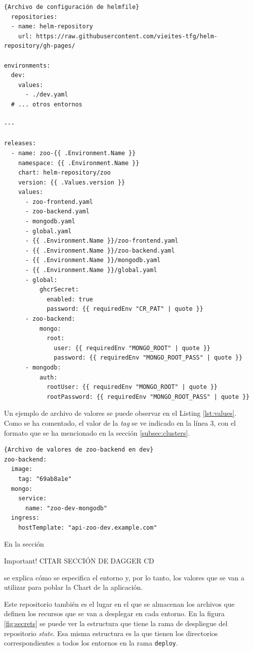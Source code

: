 \begin{lstlisting}[language=helmfile,label=lst:helmfile]{Archivo de configuración de helmfile}
  repositories:
  - name: helm-repository
    url: https://raw.githubusercontent.com/vieites-tfg/helm-repository/gh-pages/

environments:
  dev:
    values:
      - ./dev.yaml
  # ... otros entornos

---

releases:
  - name: zoo-{{ .Environment.Name }}
    namespace: {{ .Environment.Name }}
    chart: helm-repository/zoo
    version: {{ .Values.version }}
    values:
      - zoo-frontend.yaml
      - zoo-backend.yaml
      - mongodb.yaml
      - global.yaml
      - {{ .Environment.Name }}/zoo-frontend.yaml
      - {{ .Environment.Name }}/zoo-backend.yaml
      - {{ .Environment.Name }}/mongodb.yaml
      - {{ .Environment.Name }}/global.yaml
      - global:
          ghcrSecret:
            enabled: true
            password: {{ requiredEnv "CR_PAT" | quote }}
      - zoo-backend:
          mongo:
            root:
              user: {{ requiredEnv "MONGO_ROOT" | quote }}
              password: {{ requiredEnv "MONGO_ROOT_PASS" | quote }}
      - mongodb:
          auth:
            rootUser: {{ requiredEnv "MONGO_ROOT" | quote }}
            rootPassword: {{ requiredEnv "MONGO_ROOT_PASS" | quote }}
\end{lstlisting}

Un ejemplo de archivo de valores se puede observar en el Listing \ref{lst:values}. Como se ha comentado, el valor de la \textit{tag} se ve indicado en la línea 3, con el formato que se ha mencionado en la sección \ref{subsec:clusters}.

\begin{lstlisting}[label=lst:values]{Archivo de valores de zoo-backend en dev}
zoo-backend:
  image:
    tag: "69ab8a1e"
  mongo:
    service:
      name: "zoo-dev-mongodb"
  ingress:
    hostTemplate: "api-zoo-dev.example.com"
\end{lstlisting}

En la sección
\begin{bclogo}[logo=\bcattention]{Important!}
  CITAR SECCIÓN DE DAGGER CD
\end{bclogo}
se explica cómo se especifica el entorno y, por lo tanto, los valores que se van a utilizar para poblar la Chart de la aplicación.

Este repositorio también es el lugar en el que se almacenan los archivos que definen los recursos que se van a desplegar en cada entorno. En la figura \ref{fig:secrets} se puede ver la estructura que tiene la rama de despliegue del repositorio \textit{state}. Esa misma estructura es la que tienen los directorios correspondientes a todos los entornos en la rama \texttt{deploy}.
